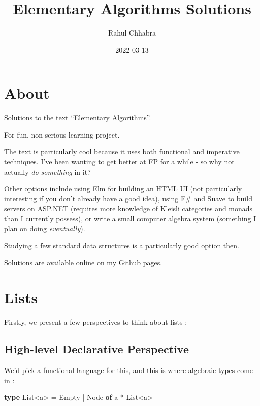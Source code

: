 \documentclass[
]{book}
\title{Elementary Algorithms Solutions}
\author{Rahul Chhabra}
\date{2022-03-13}
\newenvironment{Shaded}{\begin{snugshade}}{\end{snugshade}}
\newcommand{\KeywordTok}[1]{\textcolor[rgb]{0.13,0.29,0.53}{\textbf{#1}}}
\newcommand{\NormalTok}[1]{#1}
\begin{document}
\maketitle

{
\setcounter{tocdepth}{1}
\tableofcontents
}
\hypertarget{about}{%
\chapter*{About}\label{about}}

Solutions to the text \href{https://github.com/liuxinyu95/AlgoXY}{``Elementary Algorithms''}.

For fun, non-serious learning project.

The text is particularly cool because it uses both functional and imperative techniques. I've been wanting to get better at FP for a while - so why not actually \emph{do something} in it?

Other options include using Elm for building an HTML UI (not particularly interesting if you don't already have a good idea), using F\# and Suave to build servers on ASP.NET (requires more knowledge of Kleisli categories and monads than I currently possess), or write a small computer algebra system (something I plan on doing \emph{eventually}).

Studying a few standard data structures is a particularly good option then.

Solutions are available online on \href{https://rahulc29.github.io/Algoxy/}{my Github pages}.

\hypertarget{lists}{%
\chapter{Lists}\label{lists}}

Firstly, we present a few perspectives to think about lists :

\hypertarget{high-level-declarative-perspective}{%
\section{High-level Declarative Perspective}\label{high-level-declarative-perspective}}

We'd pick a functional language for this, and this is where algebraic types come in :

\begin{Shaded}
\begin{Highlighting}[]
\KeywordTok{type}\NormalTok{ List\textless{}\textquotesingle{}a\textgreater{} = Empty | Node }\KeywordTok{of}\NormalTok{ \textquotesingle{}a * List\textless{}\textquotesingle{}a\textgreater{}}
\end{Highlighting}
\end{Shaded}
\end{document}
